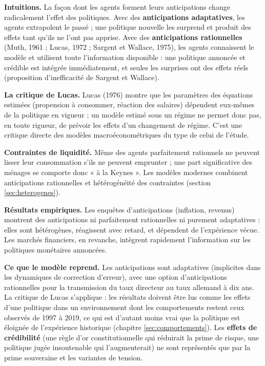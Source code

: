 \documentclass[
  11pt,
  11pt,
  a4paper,
  openany]{book}
\begin{document}
\textbf{Intuitions.} La façon dont les agents forment leurs
anticipations change radicalement l'effet des politiques. Avec des
\textbf{anticipations adaptatives}, les agents extrapolent le passé ;
une politique nouvelle les surprend et produit des effets tant qu'ils ne
l'ont pas apprise. Avec des \textbf{anticipations rationnelles} (Muth,
1961 ; Lucas, 1972 ; Sargent et Wallace, 1975), les agents connaissent
le modèle et utilisent toute l'information disponible : une politique
annoncée et crédible est intégrée immédiatement, et seules les surprises
ont des effets réels (proposition d'inefficacité de Sargent et Wallace).

\textbf{La critique de Lucas.} Lucas (1976) montre que les paramètres
des équations estimées (propension à consommer, réaction des salaires)
dépendent eux-mêmes de la politique en vigueur ; un modèle estimé sous
un régime ne permet donc pas, en toute rigueur, de prévoir les effets
d'un changement de régime. C'est une critique directe des modèles
macroéconométriques du type de celui de l'étude.

\textbf{Contraintes de liquidité.} Même des agents parfaitement
rationnels ne peuvent lisser leur consommation s'ils ne peuvent
emprunter ; une part significative des ménages se comporte donc « à la
Keynes ». Les modèles modernes combinent anticipations rationnelles et
hétérogénéité des contraintes (section \ref{sec:heterogenes}).

\textbf{Résultats empiriques.} Les enquêtes d'anticipations (inflation,
revenus) montrent des anticipations ni parfaitement rationnelles ni
purement adaptatives : elles sont hétérogènes, réagissent avec retard,
et dépendent de l'expérience vécue. Les marchés financiers, en revanche,
intègrent rapidement l'information sur les politiques monétaires
annoncées.

\textbf{Ce que le modèle reprend.} Les anticipations sont adaptatives
(implicites dans les dynamiques de correction d'erreur), avec une option
d'anticipations rationnelles pour la transmission du taux directeur au
taux allemand à dix ans. La critique de Lucas s'applique : les résultats
doivent être lus comme les effets d'une politique dans un environnement
dont les comportements restent ceux observés de 1997 à 2019, ce qui est
d'autant moins vrai que la politique est éloignée de l'expérience
historique (chapitre \ref{sec:comportements}). Les \textbf{effets de
crédibilité} (une règle d'or constitutionnelle qui réduirait la prime de
risque, une politique jugée insoutenable qui l'augmenterait) ne sont
représentés que par la prime souveraine et les variantes de tension.
\end{document}
